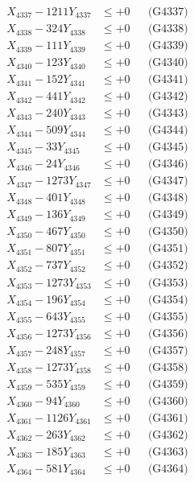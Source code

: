 \documentclass[a4paper,10pt]{article}
\begin{document}
{\begin{align}
X_{4337} - 1211Y_{4337} &\leq +0 && \text{(G4337)} \\
X_{4338} - 324Y_{4338} &\leq +0 && \text{(G4338)} \\
X_{4339} - 111Y_{4339} &\leq +0 && \text{(G4339)} \\
X_{4340} - 123Y_{4340} &\leq +0 && \text{(G4340)} \\
\allowbreak
X_{4341} - 152Y_{4341} &\leq +0 && \text{(G4341)} \\
X_{4342} - 441Y_{4342} &\leq +0 && \text{(G4342)} \\
X_{4343} - 240Y_{4343} &\leq +0 && \text{(G4343)} \\
X_{4344} - 509Y_{4344} &\leq +0 && \text{(G4344)} \\
X_{4345} - 33Y_{4345} &\leq +0 && \text{(G4345)} \\
X_{4346} - 24Y_{4346} &\leq +0 && \text{(G4346)} \\
X_{4347} - 1273Y_{4347} &\leq +0 && \text{(G4347)} \\
X_{4348} - 401Y_{4348} &\leq +0 && \text{(G4348)} \\
X_{4349} - 136Y_{4349} &\leq +0 && \text{(G4349)} \\
X_{4350} - 467Y_{4350} &\leq +0 && \text{(G4350)} \\
\allowbreak
X_{4351} - 807Y_{4351} &\leq +0 && \text{(G4351)} \\
X_{4352} - 737Y_{4352} &\leq +0 && \text{(G4352)} \\
X_{4353} - 1273Y_{4353} &\leq +0 && \text{(G4353)} \\
X_{4354} - 196Y_{4354} &\leq +0 && \text{(G4354)} \\
X_{4355} - 643Y_{4355} &\leq +0 && \text{(G4355)} \\
X_{4356} - 1273Y_{4356} &\leq +0 && \text{(G4356)} \\
X_{4357} - 248Y_{4357} &\leq +0 && \text{(G4357)} \\
X_{4358} - 1273Y_{4358} &\leq +0 && \text{(G4358)} \\
X_{4359} - 535Y_{4359} &\leq +0 && \text{(G4359)} \\
X_{4360} - 94Y_{4360} &\leq +0 && \text{(G4360)} \\
\allowbreak
X_{4361} - 1126Y_{4361} &\leq +0 && \text{(G4361)} \\
X_{4362} - 263Y_{4362} &\leq +0 && \text{(G4362)} \\
X_{4363} - 185Y_{4363} &\leq +0 && \text{(G4363)} \\
X_{4364} - 581Y_{4364} &\leq +0 && \text{(G4364)} \\

\end{align}}
\end{document}
